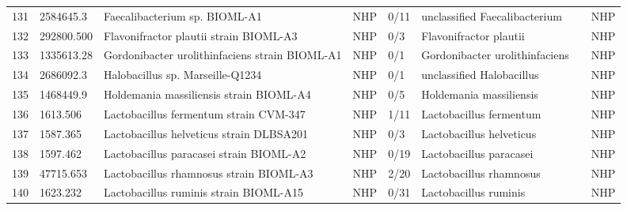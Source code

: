 \begin{longtable}{llllllll}
131 &     2584645.3 &                                            Faecalibacterium sp. BIOML-A1 &   NHP &      0/11 &                  unclassified Faecalibacterium &                      \cite{poyet2019library,benevides2017new} &   NHP \\
132 &    292800.500 &                                   Flavonifractor plautii strain BIOML-A3 &   NHP &       0/3 &                         Flavonifractor plautii &                         \cite{poyet2019library,ogita2020oral} &   NHP \\
133 &    1335613.28 &                           Gordonibacter urolithinfaciens strain BIOML-A1 &   NHP &       0/1 &                 Gordonibacter urolithinfaciens &                  \cite{poyet2019library,toney2020introducing} &   NHP \\
134 &     2686092.3 &                                         Halobacillus sp. Marseille-Q1234 &   NHP &       0/1 &                      unclassified Halobacillus &                                         \cite{joshi2013draft} &   NHP \\
135 &     1468449.9 &                                  Holdemania massiliensis strain BIOML-A4 &   NHP &       0/5 &                        Holdemania massiliensis &                         \cite{poyet2019library,mishra2013non} &   NHP \\
136 &      1613.506 &                                   Lactobacillus fermentum strain CVM-347 &   NHP &      1/11 &                        Lactobacillus fermentum &                            \cite{naghmouchi2020lactobacillus} &   NHP \\
137 &      1587.365 &                                 Lactobacillus helveticus strain DLBSA201 &   NHP &       0/3 &                       Lactobacillus helveticus &                                    \cite{taverniti2012health} &   NHP \\
138 &      1597.462 &                                  Lactobacillus paracasei strain BIOML-A2 &   NHP &      0/19 &                        Lactobacillus paracasei &                 \cite{poyet2019library,choi2020lactobacillus} &   NHP \\
139 &     47715.653 &                                  Lactobacillus rhamnosus strain BIOML-A3 &   NHP &      2/20 &                        Lactobacillus rhamnosus &   \cite{poyet2019library,westerik2018lactobacillus,47715.653} &   NHP \\
140 &      1623.232 &                                   Lactobacillus ruminis strain BIOML-A15 &   NHP &      0/31 &                          Lactobacillus ruminis &                     \cite{poyet2019library,yu2017comparative} &   NHP \\

\end{longtable}
